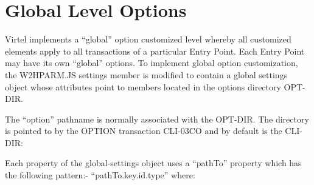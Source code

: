 \documentclass[letterpaper,10pt,english]{sphinxmanual}
\begin{document}
\ignorespaces 

\section{Global Level Options}
\label{\detokenize{Customization:global-level-options}}\label{\detokenize{Customization:index-3}}
Virtel implements a “global” option customized level whereby all customized elements apply to all transactions of a particular Entry Point. Each Entry Point may have its own “global” options. To implement global option customization, the W2HPARM.JS settings member is modified to contain a global settings object whose attributes point to members located in the options directory OPT-DIR.

\begin{sphinxVerbatim}[commandchars=\\\{\}]
   
         
         
\end{sphinxVerbatim}

The “option” pathname is normally associated with the OPT-DIR. The directory is pointed to by the OPTION transaction CLI-03CO and by default is the CLI-DIR:



Each property of the global-settings object uses a “pathTo” property which has the following pattern:- “pathTo.key.id.type” where:
\end{document}
